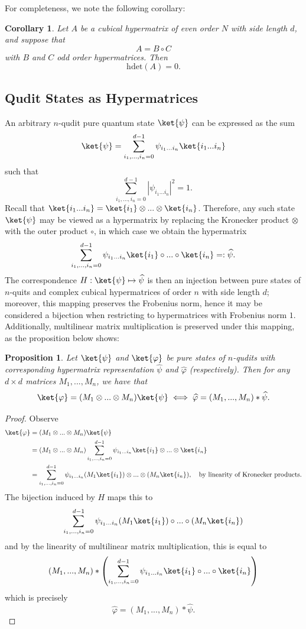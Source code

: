 \documentclass{article}
\newtheorem{proposition}{Proposition}
\newtheorem{corollary}{Corollary}
\begin{document}
For completeness, we note the following corollary:
\begin{corollary}
    Let $A$ be a cubical hypermatrix of even order $N$ with side length $d$, and suppose that 
    \[A = B\circ C\]
    with $B$ and $C$ odd order hypermatrices. Then 
    \[\mathrm{hdet}(A)=0.\]
\end{corollary}

\subsection{Qudit States as Hypermatrices}
An arbitrary $n$-qudit pure quantum state $\ket{\psi}$ can be expressed as the sum
\[\ket{\psi} = \sum\limits_{i_1,...,i_n=0}^{d-1}\psi_{i_1...i_n}\ket{i_1...i_n}\]
such that 
\[\sum\limits_{i_1,...,i_n=0}^{d-1}|\psi_{i_1...i_n}|^2=1.\]
Recall that $\ket{i_1...i_n} = \ket{i_1}\otimes...\otimes\ket{i_n}$. Therefore, any such state $\ket{\psi}$ may be viewed as a hypermatrix by replacing the Kronecker product $\otimes$ with the outer product $\circ$, in which case we obtain the hypermatrix 
\[\sum\limits_{i_1,...,i_n=0}^{d-1}\psi_{i_1...i_n}\ket{i_1}\circ...\circ \ket{i_n} =: \widehat{\psi}.\]
The correspondence $H:\ket{\psi}\mapsto \widehat{\psi}$ is then an injection between pure states of $n$-quits and complex cubical hypermatrices of order $n$ with side length $d$; moreover, this mapping preserves the Frobenius norm, hence it may be considered a bijection when restricting to hypermatrices with Frobenius norm $1$. Additionally, multilinear matrix multiplication is preserved under this mapping, as the proposition below shows:
\begin{proposition}\label{Kronecker and multi lin mat product}
    Let $\ket{\psi}$ and $\ket{\varphi}$ be pure states of $n$-qudits with corresponding hypermatrix representation $\widehat{\psi}$ and $\widehat{\varphi}$ (respectively). Then for any $d\times d$ matrices $M_1,...,M_n$, we have that  
    \[\ket{\varphi} = (M_1\otimes...\otimes M_n)\ket{\psi} \iff \widehat{\varphi} = (M_1,...,M_n)*\widehat{\psi}.\]
\end{proposition}
\begin{proof} 
    Observe 
    \begin{align*}
        \ket{\varphi} &= (M_1\otimes...\otimes M_n) \ket{\psi} \\
        &= (M_1\otimes...\otimes M_n)\sum\limits_{i_1,...,i_n=0}^{d-1}\psi_{i_1...i_n}\ket{i_1}\otimes...\otimes \ket{i_n} \\
        &= \sum\limits_{i_1,...,i_n=0}^{d-1}\psi_{i_1...i_n}(M_1\ket{i_1})\otimes...\otimes (M_n\ket{i_n}),\quad \text{by linearity of Kronecker products.}
    \end{align*}
    The bijection induced by $H$ maps this to
    \[\sum\limits_{i_1,...,i_n=0}^{d-1}\psi_{i_1...i_n}(M_1\ket{i_1})\circ...\circ (M_n\ket{i_n})\]
    and by the linearity of multilinear matrix multiplication, this is equal to
    \[(M_1,...,M_n)*\left(\sum\limits_{i_1,...,i_n=0}^{d-1}\psi_{i_1...i_n}\ket{i_1}\circ...\circ \ket{i_n}\right)\]
    which is precisely
    \[\widehat{\varphi}=(M_1,...,M_n)*\widehat{\psi}.\]
\end{proof}
\end{document}
